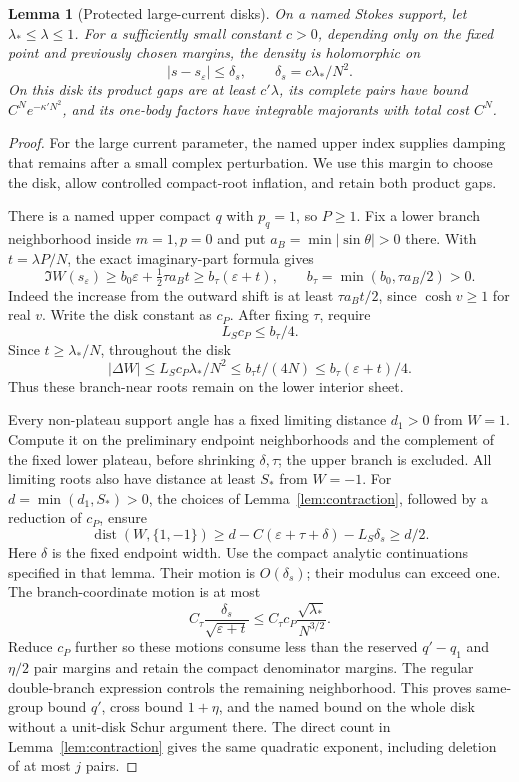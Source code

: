 \documentclass[11pt]{article}
\numberwithin{equation}{section}
\newtheorem{lemma}[theorem]{Lemma}
\theoremstyle{definition}
\newcommand{\eps}{\varepsilon}
\begin{document}
\begin{lemma}[Protected large-current disks]\label{lem:protected}
On a named Stokes support, let \(\lambda_*\le\lambda\le1\).
For a sufficiently small constant \(c>0\), depending only on
the fixed point and previously chosen margins, the density is
holomorphic on
\[
 |s-s_\eps|\le\delta_s,\qquad \delta_s=c\lambda_*/N^2 .
\]
On this disk its product gaps are at least \(c'\lambda\),
its complete pairs have bound \(C^Ne^{-\kappa' N^2}\), and its
one-body factors have integrable majorants with total cost \(C^N\).
\end{lemma}
\begin{proof}
For the large current parameter, the named upper index supplies damping that remains after a small complex perturbation. We use this margin to choose the disk, allow controlled compact-root inflation, and retain both product gaps.

There is a named upper compact \(q\) with \(p_q=1\), so
\(P\ge1\). Fix a lower branch neighborhood inside \(m=1,p=0\)
and put \(a_B=\min|\sin\theta|>0\) there. With
\(t=\lambda P/N\), the exact imaginary-part formula gives
\[
 \Im W(s_\eps)\ge b_0\eps+\tfrac12\tau a_Bt
 \ge b_\tau(\eps+t),\qquad
 b_\tau=\min(b_0,\tau a_B/2)>0.
\]
Indeed the increase from the outward shift is at least
\(\tau a_Bt/2\), since \(\cosh v\ge1\) for real \(v\).
Write the disk constant as \(c_P\). After fixing \(\tau\), require
\[
 L_Sc_P\le b_\tau/4.
\]
Since \(t\ge\lambda_*/N\), throughout the disk
\[
 |\Delta W|\le L_Sc_P\lambda_*/N^2
 \le b_\tau t/(4N)\le b_\tau(\eps+t)/4.
\]
Thus these branch-near roots remain on the lower interior sheet.

Every non-plateau support angle has a fixed limiting distance
\(d_1>0\) from \(W=1\). Compute it on the preliminary endpoint
neighborhoods and the complement of the fixed lower plateau,
before shrinking \(\delta,\tau\); the upper branch is excluded.
All limiting
roots also have distance at least \(S_*\) from \(W=-1\).
For \(d=\min(d_1,S_*)>0\), the choices of
Lemma~\ref{lem:contraction}, followed by a reduction of \(c_P\),
ensure
\[
 \operatorname{dist}(W,\{1,-1\})
 \ge d-C(\eps+\tau+\delta)-L_S\delta_s\ge d/2.
\]
Here \(\delta\) is the fixed endpoint width.
Use the compact analytic continuations specified in that lemma.
Their motion is \(O(\delta_s)\); their modulus can exceed one.
The branch-coordinate motion is at most
\[
 C_\tau\frac{\delta_s}{\sqrt{\eps+t}}
 \le C_\tau c_P\frac{\sqrt{\lambda_*}}{N^{3/2}}.
\]
Reduce \(c_P\) further so these motions consume less than
the reserved \(q'-q_1\) and \(\eta/2\) pair margins and retain
the compact denominator margins. The regular double-branch
expression controls the remaining neighborhood. This proves
same-group bound \(q'\), cross bound \(1+\eta\), and the named
bound on the whole disk without a unit-disk Schur argument there.
The direct count in Lemma~\ref{lem:contraction} gives the same
quadratic exponent, including deletion of at most \(j\) pairs.


\end{proof}
\end{document}
